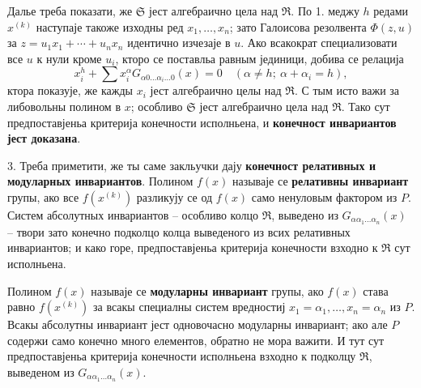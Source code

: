 ﻿\documentclass[11pt]{article}
\begin{document}
Далье треба показати, же $\mathfrak S$ јест алгебраично цела над $\mathfrak R$. По 1. меджу $h$ редами $x^{(k)}$ наступаје такоже изходны ред $x_1,\ldots,x_n$; зато Галоисова резолвента $\Phi(z,u)$ за $z=u_1x_1+\cdots+u_nx_n$ идентично изчезаје в $u$. Ако всакократ специализовати все $u$ к нули кроме $u_i$, кторо се поставльа равным јединици, добива се релација
\[
 x_i^h+\sum x_i^\alpha G_{\alpha0\ldots\alpha_i\ldots0}(x)=0
 \quad (\alpha\ne h;\ \alpha+\alpha_i=h),
\]
ктора показује, же кажды $x_i$ јест алгебраично целы над $\mathfrak R$. С тым исто важи за либовольны полином в $x$; особливо $\mathfrak S$ јест алгебраично цела над $\mathfrak R$. Тако сут предпоставјеньа критерија конечности исполньена, и \textbf{конечност инвариантов јест доказана}.

3. Треба приметити, же ты саме закльучки дају \textbf{конечност релативных и модуларных инвариантов}. Полином $f(x)$ называје се \textbf{релативны инвариант} групы, ако все $f(x^{(k)})$ разликују се од $f(x)$ само ненуловым фактором из $P$. Систем абсолутных инвариантов -- особливо колцо $\mathfrak R$, выведено из $G_{\alpha\alpha_1\ldots\alpha_n}(x)$ -- твори зато конечно подколцо колца выведеного из всих релативных инвариантов; и како горе, предпоставјеньа критерија конечности взходно к $\mathfrak R$ сут исполньена.

Полином $f(x)$ называје се \textbf{модуларны инвариант} групы, ако $f(x)$ става равно $f(x^{(k)})$ за всакы специалны систем вредностиј $x_1=\alpha_1,\ldots,x_n=\alpha_n$ из $P$. Всакы абсолутны инвариант јест одновочасно модуларны инвариант; ако але $P$ содержи само конечно много елементов, обратно не мора важити. И тут сут предпоставјеньа критерија конечности исполньена взходно к подколцу $\mathfrak R$, выведеном из $G_{\alpha\alpha_1\ldots\alpha_n}(x)$.

\clearpage
\end{document}
